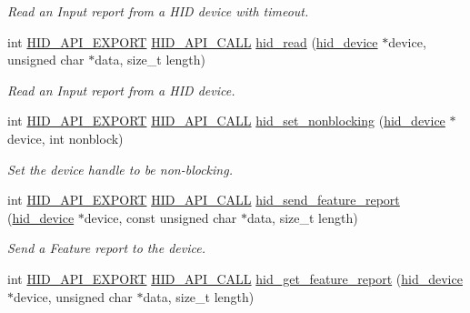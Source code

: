 \begin{DoxyCompactItemize}
\begin{DoxyCompactList}\small\item\em \-Read an \-Input report from a \-H\-I\-D device with timeout. \end{DoxyCompactList}\item 
int \hyperlink{hidapi_8h_aa60150016800ccb88fdf140e8553ae13}{\-H\-I\-D\-\_\-\-A\-P\-I\-\_\-\-E\-X\-P\-O\-R\-T} \hyperlink{hidapi_8h_af140a25716604e86096670a505a58ee0}{\-H\-I\-D\-\_\-\-A\-P\-I\-\_\-\-C\-A\-L\-L} \hyperlink{group___a_p_i_ga6b820f3e72097cf7f994e33715dc7af1}{hid\-\_\-read} (\hyperlink{hidapi_8h_aa6da74d5686d198dd3e5440e60088fcc}{hid\-\_\-device} $\ast$device, unsigned char $\ast$data, size\-\_\-t length)
\begin{DoxyCompactList}\small\item\em \-Read an \-Input report from a \-H\-I\-D device. \end{DoxyCompactList}\item 
int \hyperlink{hidapi_8h_aa60150016800ccb88fdf140e8553ae13}{\-H\-I\-D\-\_\-\-A\-P\-I\-\_\-\-E\-X\-P\-O\-R\-T} \hyperlink{hidapi_8h_af140a25716604e86096670a505a58ee0}{\-H\-I\-D\-\_\-\-A\-P\-I\-\_\-\-C\-A\-L\-L} \hyperlink{group___a_p_i_gaf9d54208d314047727598b506577bb87}{hid\-\_\-set\-\_\-nonblocking} (\hyperlink{hidapi_8h_aa6da74d5686d198dd3e5440e60088fcc}{hid\-\_\-device} $\ast$device, int nonblock)
\begin{DoxyCompactList}\small\item\em \-Set the device handle to be non-\/blocking. \end{DoxyCompactList}\item 
int \hyperlink{hidapi_8h_aa60150016800ccb88fdf140e8553ae13}{\-H\-I\-D\-\_\-\-A\-P\-I\-\_\-\-E\-X\-P\-O\-R\-T} \hyperlink{hidapi_8h_af140a25716604e86096670a505a58ee0}{\-H\-I\-D\-\_\-\-A\-P\-I\-\_\-\-C\-A\-L\-L} \hyperlink{group___a_p_i_gae43ab80f741786ac4374216658fd5ab3}{hid\-\_\-send\-\_\-feature\-\_\-report} (\hyperlink{hidapi_8h_aa6da74d5686d198dd3e5440e60088fcc}{hid\-\_\-device} $\ast$device, const unsigned char $\ast$data, size\-\_\-t length)
\begin{DoxyCompactList}\small\item\em \-Send a \-Feature report to the device. \end{DoxyCompactList}\item 
int \hyperlink{hidapi_8h_aa60150016800ccb88fdf140e8553ae13}{\-H\-I\-D\-\_\-\-A\-P\-I\-\_\-\-E\-X\-P\-O\-R\-T} \hyperlink{hidapi_8h_af140a25716604e86096670a505a58ee0}{\-H\-I\-D\-\_\-\-A\-P\-I\-\_\-\-C\-A\-L\-L} \hyperlink{group___a_p_i_ga34d43ac6da0fb785b88fcc2edf13ed65}{hid\-\_\-get\-\_\-feature\-\_\-report} (\hyperlink{hidapi_8h_aa6da74d5686d198dd3e5440e60088fcc}{hid\-\_\-device} $\ast$device, unsigned char $\ast$data, size\-\_\-t length)

\end{DoxyCompactItemize}
